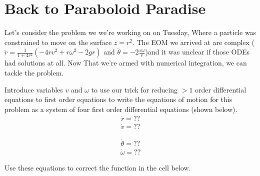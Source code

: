 \documentclass[letterpaper,10pt,english]{jupyterBook}
\begin{document}
\section{Back to Paraboloid Paradise}
\label{\detokenize{content/1_mechanics/lagrange_2:back-to-paraboloid-paradise}}
\sphinxAtStartPar
Let’s consider the problem we we’re working on on Tuesday, Where a particle was constrained to move on the surface \(z = r^2\). The EOM we arrived at are complex (\(\ddot{r} = \frac{1}{1 + 4r^2}(- 4rv^2 + r\omega^2 -2gr)\) and \(\ddot{\theta} = -2\frac{v\omega}{r} \))and it was unclear if those ODEs had solutions at all. Now That we’re armed with numerical integration, we can tackle the problem.

\sphinxAtStartPar
{}

\sphinxAtStartPar
Introduce variables \(v\) and \(\omega\) to use our trick for reducing \(>1\) order differential equations to first order equations to write the equations of motion for this problem as a system of four first order differential equations (shown below).
\begin{equation*}
\begin{split}\dot{r} = ?? \end{split}
\end{equation*}\begin{equation*}
\begin{split}\dot{v} = ??\end{split}
\end{equation*}



\begin{equation*}
\begin{split}\dot{\theta} = ?? \end{split}
\end{equation*}\begin{equation*}
\begin{split}\dot{\omega} = ??\end{split}
\end{equation*}




\sphinxAtStartPar
{}

\sphinxAtStartPar
Use these equations to correct the  function in the cell below.
\end{document}
